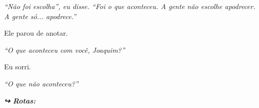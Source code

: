 \noindent \textit{\textquotedblleft{}Não foi escolha\textquotedblright{}\textit{, eu disse. }\textquotedblleft{}Foi o que aconteceu. A gente não escolhe apodrecer. A gente só... apodrece.\textquotedblright{}}

\noindent Ele parou de anotar.

\noindent \textit{\textquotedblleft{}O que aconteceu com você, Joaquim?\textquotedblright{}}

\noindent Eu sorri.

\noindent \textit{\textquotedblleft{}O que não aconteceu?\textquotedblright{}}

\vspace{0.5em}
\noindent\textit{\textbf{↪ Rotas:}  \rotasep {} \rotasep {}}